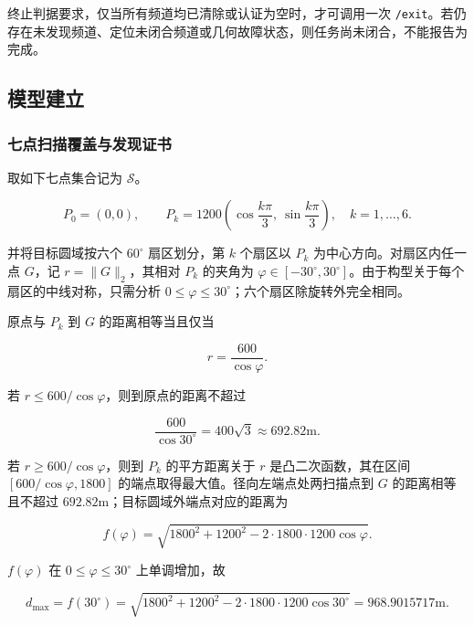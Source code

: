终止判据要求，仅当所有频道均已清除或认证为空时，才可调用一次 \texttt{/exit}。若仍存在未发现频道、定位未闭合频道或几何故障状态，则任务尚未闭合，不能报告为完成。

\subsection{模型建立}

\subsubsection{七点扫描覆盖与发现证书}

取如下七点集合记为 $\mathcal S$。

\begin{equation}
P_0=(0,0),
\qquad
P_k=1200\left(\cos\frac{k\pi}{3},\ \sin\frac{k\pi}{3}\right),
\quad k=1,\ldots,6.
\label{eq:q3_scan_sites}
\end{equation}

并将目标圆域按六个 $60^\circ$ 扇区划分，第 $k$ 个扇区以 $P_k$ 为中心方向。对扇区内任一点 $G$，记 $r=\lVert G\rVert_2$，其相对 $P_k$ 的夹角为 $\varphi\in[-30^\circ,30^\circ]$。由于构型关于每个扇区的中线对称，只需分析 $0\le\varphi\le30^\circ$；六个扇区除旋转外完全相同。

原点与 $P_k$ 到 $G$ 的距离相等当且仅当

\begin{equation}
r=\frac{600}{\cos\varphi}.
\label{eq:q3_voronoi_boundary}
\end{equation}

若 $r\le600/\cos\varphi$，则到原点的距离不超过

\begin{equation}
\frac{600}{\cos30^\circ}=400\sqrt3\approx692.82\mathrm{m}.
\label{eq:q3_inner_bound}
\end{equation}

若 $r\ge600/\cos\varphi$，则到 $P_k$ 的平方距离关于 $r$ 是凸二次函数，其在区间 $[600/\cos\varphi,1800]$ 的端点取得最大值。径向左端点处两扫描点到 $G$ 的距离相等且不超过 $692.82\mathrm{m}$；目标圆域外端点对应的距离为

\begin{equation}
f(\varphi)
=
\sqrt{1800^2+1200^2-2\cdot1800\cdot1200\cos\varphi}.
\label{eq:q3_outer_radial}
\end{equation}

$f(\varphi)$ 在 $0\le\varphi\le30^\circ$ 上单调增加，故

\begin{equation}
d_{\max}
=f(30^\circ)
=
\sqrt{1800^2+1200^2-2\cdot1800\cdot1200\cos30^\circ}
=968.9015717\mathrm{m}.
\label{eq:q3_dmax}
\end{equation}

